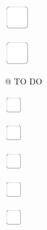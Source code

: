 \documentclass[11pt,titlepage]{article}
\begin{document}
\vspace{12mm}

\noindent
\includegraphics[]{checkbox-6mm.pdf}

\vspace{12mm}

\noindent
\includegraphics[]{checkbox-6mm.pdf}

\pagebreak

\small %
\noindent \hspace{-4mm} @ \hfill TO DO

\vspace{6mm}

\noindent
\includegraphics[]{checkbox-4mm.pdf}

\vspace{10mm}

\noindent
\includegraphics[]{checkbox-4mm.pdf}

\vspace{10mm}

\noindent
\includegraphics[]{checkbox-4mm.pdf}

\vspace{10mm}

\noindent
\includegraphics[]{checkbox-4mm.pdf}

\vspace{10mm}

\noindent
\includegraphics[]{checkbox-4mm.pdf}

\vspace{10mm}
\end{document}
